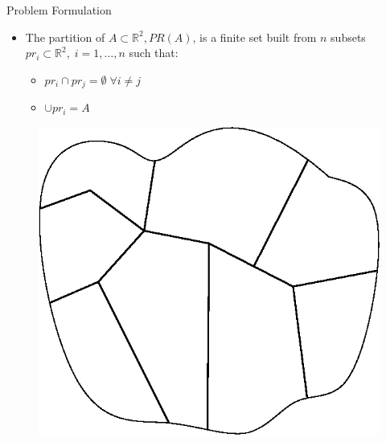 \documentclass[t]{beamer}
\begin{document}
\begin{frame}[label=probformulation2]{Problem Formulation}
\begin{itemize}
\item The partition of $A \subset \mathbb{R}^2, PR\left( A \right)$, is a finite set built from $n$ subsets $pr_{i} \subset \mathbb{R}^2 ,\; i=1, \ldots, n$ such that:
\begin{itemize}
\item $pr_i \cap pr_j = \emptyset \; \forall i \neq j$
\item $\cup pr_i = A$
\end{itemize}
\end{itemize}
\begin{figure}[b]
\includegraphics[scale=0.5]{motivation/partitioning.eps}
\end{figure}
\end{frame}
\end{document}
